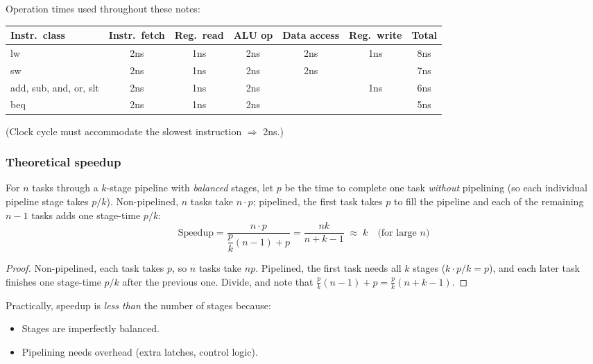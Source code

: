 Operation times used throughout these notes:

\begin{center}
\begin{tabular}{@{}lcccccc@{}}
\toprule
Instr.\ class & Instr.\ fetch & Reg.\ read & ALU op & Data access & Reg.\ write & Total \\
\midrule
lw                     & 2ns & 1ns & 2ns & 2ns & 1ns & 8ns \\
sw                     & 2ns & 1ns & 2ns & 2ns &     & 7ns \\
add, sub, and, or, slt & 2ns & 1ns & 2ns &     & 1ns & 6ns \\
beq                    & 2ns & 1ns & 2ns &     &     & 5ns \\
\bottomrule
\end{tabular}
\end{center}
(Clock cycle must accommodate the slowest instruction $\Rightarrow$ 2ns.)

\subsubsection{Theoretical speedup}

\begin{theorem}
For $n$ tasks through a $k$-stage pipeline with \emph{balanced} stages, let
$p$ be the time to complete one task \emph{without} pipelining (so each
individual pipeline stage takes $p/k$). Non-pipelined, $n$ tasks take
$n\cdot p$; pipelined, the first task takes $p$ to fill the pipeline and
each of the remaining $n-1$ tasks adds one stage-time $p/k$:
\[
  \text{Speedup} = \frac{n \cdot p}{\dfrac{p}{k}(n-1) + p}
  = \frac{nk}{n+k-1}
  \;\approx\; k
  \quad \text{(for large $n$)}
\]
\end{theorem}

\begin{proof}
Non-pipelined, each task takes $p$, so $n$ tasks take $np$. Pipelined, the
first task needs all $k$ stages ($k\cdot p/k = p$), and each later task
finishes one stage-time $p/k$ after the previous one. Divide, and note that
$\frac{p}{k}(n-1)+p = \frac{p}{k}(n+k-1)$.
\end{proof}

Practically, speedup is \emph{less than} the number of stages because:
\begin{itemize}
  \item Stages are imperfectly balanced.
  \item Pipelining needs overhead (extra latches, control logic).
\end{itemize}

